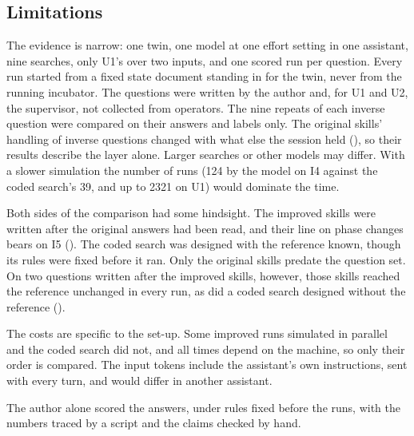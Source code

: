   \subsection{Limitations}
  \label{sec:limitations}

  The evidence is narrow: one twin, one model at one effort setting in one assistant, nine
  searches, only U1's over two inputs, and one scored run per question. Every run started from a fixed state document standing in
  for the twin, never from the running incubator. The questions were written by the author and,
  for U1 and U2, the supervisor, not collected from operators. The nine repeats of each
  inverse question were compared on their answers and labels only. The original skills' handling of inverse questions changed with what else the
  session held (), so their results describe the layer alone. Larger searches
  or other models may differ. With a slower simulation the number of runs (124 by the model
  on I4 against the coded search's 39, and up to 2321 on U1) would dominate the time.

  Both sides of the comparison had some hindsight. The improved skills were written after the
  original answers had been read, and their line on phase changes bears on I5
  (). The coded search was designed with the reference known, though its rules
  were fixed before it ran. Only the original skills predate the question set. On two
  questions written after the improved skills, however, those skills reached the reference
  unchanged in every run, as did a coded search designed without the reference ().

  The costs are specific to the set-up. Some improved runs simulated in parallel and the coded
  search did not, and all times depend on the machine, so only their order is compared. The input
  tokens include the assistant's own instructions, sent with every turn, and would differ in
  another assistant.

  The author alone scored the answers, under rules fixed before the runs, with the numbers traced
  by a script and the claims checked by hand.
